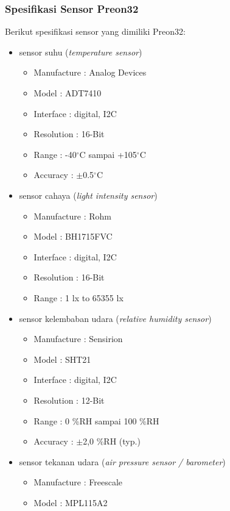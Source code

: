 \subsubsection{Spesifikasi Sensor Preon32}
\label{subsubsec:specPreon32}
Berikut spesifikasi sensor yang dimiliki Preon32:
	\begin{itemize}
		\item sensor suhu ({\it temperature sensor})
			\begin{itemize}
    			\item Manufacture : Analog Devices
    			\item Model : ADT7410
    			\item Interface : digital, I2C
    			\item Resolution : 16-Bit
    			\item Range : -40$^{\circ}$C sampai +105$^{\circ}$C
    			\item Accuracy : $\pm$0.5$^{\circ}$C
			\end{itemize}
		\item sensor cahaya ({\it light intensity sensor})
			\begin{itemize}
				\item Manufacture : Rohm
    			\item Model : BH1715FVC
   				\item Interface : digital, I2C
    			\item Resolution : 16-Bit
    			\item Range : 1 lx to 65355 lx
			\end{itemize}
		\item sensor kelembaban udara ({\it relative humidity sensor})
			\begin{itemize}
    			\item Manufacture : Sensirion
    			\item Model : SHT21
    			\item Interface : digital, I2C
    			\item Resolution : 12-Bit
    			\item Range : 0 \%RH sampai 100 \%RH
    			\item Accuracy : $\pm$2,0 \%RH (typ.)
			\end{itemize}
		\item sensor tekanan udara ({\it air pressure sensor / barometer})
			\begin{itemize}
    			\item Manufacture : Freescale
    			\item Model : MPL115A2

\end{itemize}
\end{itemize}
